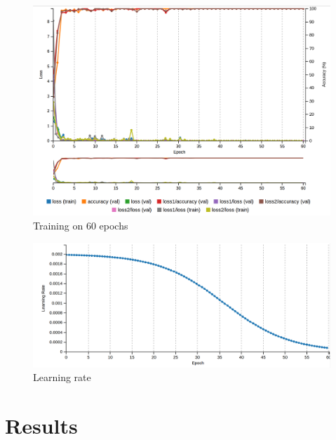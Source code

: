 \documentclass[10pt,jaurnal,compsoc]{IEEEtran}
\begin{document}
\begin{figure}
      \centering
      \includegraphics[width=\linewidth]{training}
      \caption{Training on 60 epochs}
      \label{fig:robot1}
\end{figure}

\begin{figure}
      \centering
      \includegraphics[width=\linewidth]{learning}
      \caption{Learning rate}
      \label{fig:robot1}
\end{figure}



\section{Results}
\end{document}
